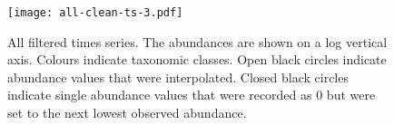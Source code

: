 \documentclass[11pt]{article}
\begin{document}
\clearpage

\begin{figure}[htbp]
\begin{center}
\texttt{[image: all-clean-ts-3.pdf]} \caption{All filtered times series. The abundances are shown on a log vertical axis. Colours indicate taxonomic classes. Open black circles indicate abundance values that were interpolated. Closed black circles indicate single abundance values that were recorded as 0 but were set to the next lowest observed abundance.}
    \label{fig:all-ts}
\end{center}
\end{figure}
\end{document}
